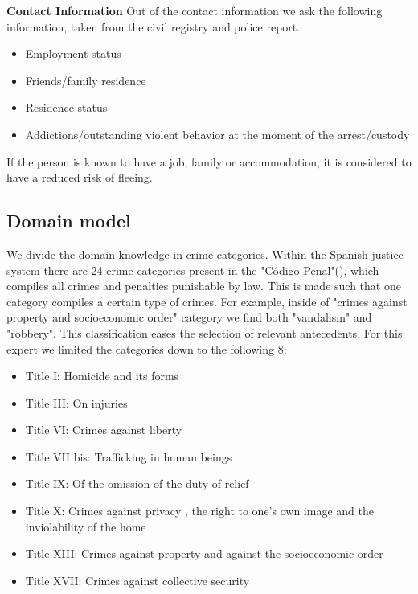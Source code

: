 \documentclass{article}
\begin{document}
\textbf{Contact Information} Out of the contact information we ask the following information, taken from the civil registry and police report.
\begin{itemize}
    \item Employment status
    \item Friends/family residence
    \item Residence status
    \item Addictions/outstanding violent behavior at the moment of the arrest/custody
\end{itemize}
If the person is known to have a job, family or accommodation, it is considered to have a reduced risk of fleeing.

\subsection{Domain model}
We divide the domain knowledge in crime categories. Within the Spanish justice system there are 24 crime categories present in the "Código Penal"(\cite{CdigoPenal}), which compiles all crimes and penalties punishable by law. This is made such that one category compiles a certain type of crimes. For example, inside of "crimes against property and socioeconomic order" category we find both "vandalism" and "robbery". This classification eases the selection of relevant antecedents.
For this expert we limited the categories down to the following 8:
\begin{itemize}
    \item Title I: Homicide and its forms
    \item Title III: On injuries
    \item Title VI: Crimes against liberty
    \item Title VII bis: Trafficking in human beings
    \item Title IX: Of the omission of the duty of relief
    \item Title X: Crimes against privacy , the right to one's own image and the inviolability of the home
    \item Title XIII: Crimes against property and against the socioeconomic order
    \item Title XVII: Crimes against collective security
\end{itemize}
\end{document}
